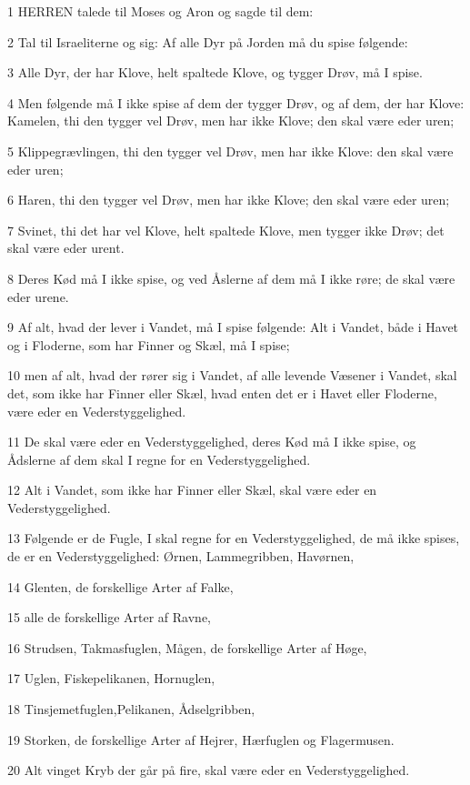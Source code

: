 \par 1 HERREN talede til Moses og Aron og sagde til dem:
\par 2 Tal til Israeliterne og sig: Af alle Dyr på Jorden må du spise følgende:
\par 3 Alle Dyr, der har Klove, helt spaltede Klove, og tygger Drøv, må I spise.
\par 4 Men følgende må I ikke spise af dem der tygger Drøv, og af dem, der har Klove: Kamelen, thi den tygger vel Drøv, men har ikke Klove; den skal være eder uren;
\par 5 Klippegrævlingen, thi den tygger vel Drøv, men har ikke Klove: den skal være eder uren;
\par 6 Haren, thi den tygger vel Drøv, men har ikke Klove; den skal være eder uren;
\par 7 Svinet, thi det har vel Klove, helt spaltede Klove, men tygger ikke Drøv; det skal være eder urent.
\par 8 Deres Kød må I ikke spise, og ved Åslerne af dem må I ikke røre; de skal være eder urene.
\par 9 Af alt, hvad der lever i Vandet, må I spise følgende: Alt i Vandet, både i Havet og i Floderne, som har Finner og Skæl, må I spise;
\par 10 men af alt, hvad der rører sig i Vandet, af alle levende Væsener i Vandet, skal det, som ikke har Finner eller Skæl, hvad enten det er i Havet eller Floderne, være eder en Vederstyggelighed.
\par 11 De skal være eder en Vederstyggelighed, deres Kød må I ikke spise, og Ådslerne af dem skal I regne for en Vederstyggelighed.
\par 12 Alt i Vandet, som ikke har Finner eller Skæl, skal være eder en Vederstyggelighed.
\par 13 Følgende er de Fugle, I skal regne for en Vederstyggelighed, de må ikke spises, de er en Vederstyggelighed: Ørnen, Lammegribben, Havørnen,
\par 14 Glenten, de forskellige Arter af Falke,
\par 15 alle de forskellige Arter af Ravne,
\par 16 Strudsen, Takmasfuglen, Mågen, de forskellige Arter af Høge,
\par 17 Uglen, Fiskepelikanen, Hornuglen,
\par 18 Tinsjemetfuglen,Pelikanen, Ådselgribben,
\par 19 Storken, de forskellige Arter af Hejrer, Hærfuglen og Flagermusen.
\par 20 Alt vinget Kryb der går på fire, skal være eder en Vederstyggelighed.
